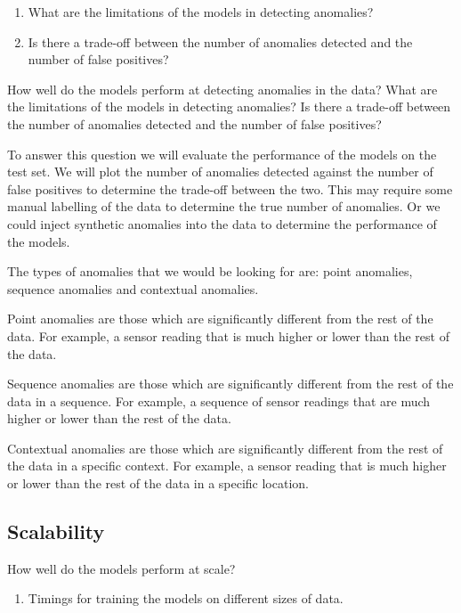 \begin{enumerate}
    \item What are the limitations of the models in detecting anomalies?
    \item Is there a trade-off between the number of anomalies detected and the number of false positives?
\end{enumerate}

How well do the models perform at detecting anomalies in the data? What are the limitations of the models in detecting anomalies? Is there a trade-off between the number of anomalies detected and the number of false positives?

To answer this question we will evaluate the performance of the models on the test set. We will plot the number of anomalies detected against the number of false positives to determine the trade-off between the two. This may require some manual labelling of the data to determine the true number of anomalies. Or we could inject synthetic anomalies into the data to determine the performance of the models.

The types of anomalies that we would be looking for are: point anomalies, sequence anomalies and contextual anomalies.

Point anomalies are those which are significantly different from the rest of the data. For example, a sensor reading that is much higher or lower than the rest of the data.

Sequence anomalies are those which are significantly different from the rest of the data in a sequence. For example, a sequence of sensor readings that are much higher or lower than the rest of the data.

Contextual anomalies are those which are significantly different from the rest of the data in a specific context. For example, a sensor reading that is much higher or lower than the rest of the data in a specific location.



\subsection{Scalability}

How well do the models perform at scale?
\begin{enumerate}
    \item Timings for training the models on different sizes of data.
\end{enumerate}